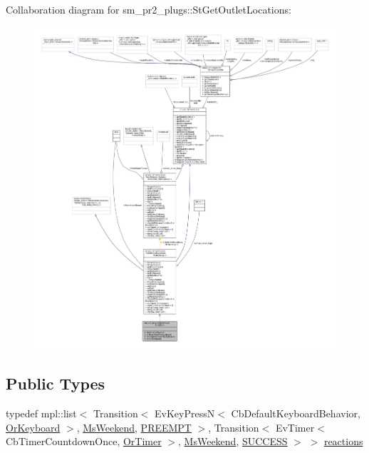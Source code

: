 Collaboration diagram for sm\+\_\+pr2\+\_\+plugs\+:\+:St\+Get\+Outlet\+Locations\+:
\nopagebreak
\begin{figure}[H]
\begin{center}
\leavevmode
\includegraphics[width=350pt]{structsm__pr2__plugs_1_1StGetOutletLocations__coll__graph}
\end{center}
\end{figure}
\subsection*{Public Types}
\begin{DoxyCompactItemize}
\item 
typedef mpl\+::list$<$ Transition$<$ Ev\+Key\+PressN$<$ Cb\+Default\+Keyboard\+Behavior, \hyperlink{classsm__pr2__plugs_1_1OrKeyboard}{Or\+Keyboard} $>$, \hyperlink{classsm__pr2__plugs_1_1MsWeekend}{Ms\+Weekend}, \hyperlink{classPREEMPT}{P\+R\+E\+E\+M\+PT} $>$, Transition$<$ Ev\+Timer$<$ Cb\+Timer\+Countdown\+Once, \hyperlink{classsm__pr2__plugs_1_1OrTimer}{Or\+Timer} $>$, \hyperlink{classsm__pr2__plugs_1_1MsWeekend}{Ms\+Weekend}, \hyperlink{classSUCCESS}{S\+U\+C\+C\+E\+SS} $>$ $>$ \hyperlink{structsm__pr2__plugs_1_1StGetOutletLocations_a29fe1adf7ea3dc5988b17b08fc8ab1c9}{reactions}
\end{DoxyCompactItemize}
